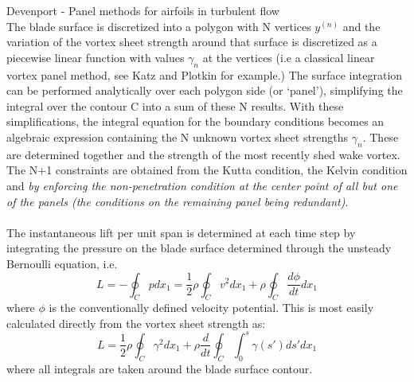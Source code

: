 \documentclass{article}
\begin{document}
\noindent Devenport - Panel methods for airfoils in turbulent flow \\

\noindent The blade surface is discretized into a polygon with N vertices \textbf{$y^{(n)}$} and the variation of the vortex sheet strength around that surface is discretized as a piecewise linear function with values $\gamma_n$ at the vertices (i.e a classical linear vortex panel method, see Katz and Plotkin for example.) The surface integration can be performed analytically over each polygon side (or `panel'), simplifying the integral over the contour C into a sum of these N results. With these simplifications, the integral equation for the boundary conditions becomes an algebraic expression containing the N unknown vortex sheet strengths $\gamma_n$. These are determined together and the strength of the most recently shed wake vortex. The N+1 constraints are obtained from the Kutta condition, the Kelvin condition and \emph{by enforcing the non-penetration condition at the center point of all but one of the panels (the conditions on the remaining panel being redundant)}.\\\\
The instantaneous lift per unit span is determined at each time step by integrating the pressure on the blade surface determined through the unsteady Bernoulli equation, i.e.\\
\begin{equation}
L = - \oint_C p dx_1 = \frac{1}{2}\rho \oint_C  v^2 dx_{1} + \rho \oint_C \frac{d \phi}{dt} dx_{1}
\end{equation}
where $\phi$ is the conventionally defined velocity potential. This is most easily calculated directly from the vortex sheet strength as:\\
\begin{equation}
L = \frac{1}{2} \rho \oint_C \gamma^2 dx_1 + \rho \frac{d}{dt} \oint_C \int_{0}^{s} \gamma(s') ds' dx_1
\end{equation}
where all integrals are taken around the blade surface contour. 
\end{document}

